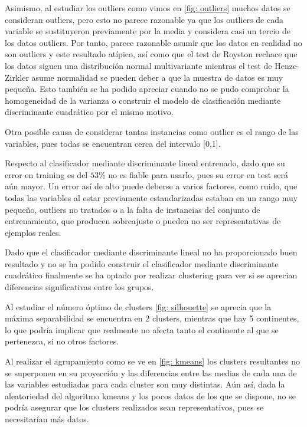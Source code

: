 \documentclass[twoside,openright,titlepage,numbers=noenddot,openany,headinclude,footinclude=true,
cleardoublepage=empty,abstractoff,BCOR=5mm,paper=a4,fontsize=12pt,main=spanish]{scrreprt}
\begin{document}
Asimismo, al estudiar los outliers como vimos en \eqref{fig: outliers} muchos datos se consideran outliers, pero esto no parece razonable ya que los outliers de cada variable se sustituyeron previamente por la media y considera casi un tercio de los datos outliers. Por tanto, parece razonable asumir que los datos en realidad no son outliers y este resultado atípico, así como que el test de Royston rechace que los datos siguen una distribución normal multivariante mientras el test de Henze-Zirkler asume normalidad se pueden deber a que la muestra de datos es muy pequeña. Esto también se ha podido apreciar cuando no se pudo comprobar la homogeneidad de la varianza o construir el modelo de clasificación mediante discriminante cuadrático por el mismo motivo.

Otra posible causa de considerar tantas instancias como outlier es el rango de las variables, pues todas se encuentran cerca del intervalo [0,1].

Respecto al clasificador mediante discriminante lineal entrenado, dado que su error en training es del $53\%$ no es fiable para usarlo, pues su error en test será aún mayor. Un error así de alto puede deberse a varios factores, como ruido, que todas las variables al estar previamente estandarizadas estaban en un rango muy pequeño, outliers no tratados o a la falta de instancias del conjunto de entrenamiento, que producen sobreajuste o pueden no ser representativas de ejemplos reales.

Dado que el clasificador mediante discriminante lineal no ha proporcionado buen resultado y no se ha podido construir el clasificador mediante discriminante cuadrático finalmente se ha optado por realizar clustering para ver si se aprecian diferencias significativas entre los grupos.

Al estudiar el número óptimo de clusters \eqref{fig: silhouette} se aprecia que la máxima separabilidad se encuentra en 2 clusters, mientras que hay 5 continentes, lo que podría implicar que realmente no afecta tanto el continente al que se pertenezca, si no otros factores.

Al realizar el agrupamiento como se ve en \eqref{fig: kmeans} los clusters resultantes no se superponen en su proyección y las diferencias entre las medias de cada una de las variables estudiadas para cada cluster son muy distintas. Aún así, dada la aleatoriedad del algoritmo kmeans y los pocos datos de los que se dispone, no se podría asegurar que los clusters realizados sean representativos, pues se necesitarían más datos. 
\end{document}
